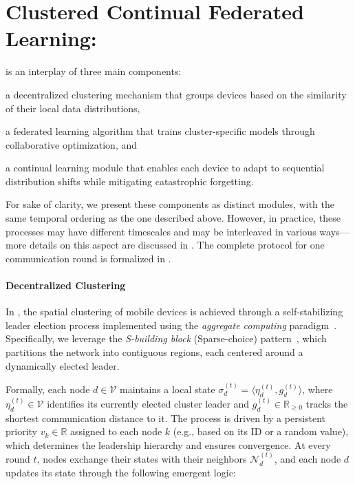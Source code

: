 \documentclass[conference]{IEEEtran}
\theoremstyle{plain}
\theoremstyle{definition}
\begin{document}
\section{Clustered Continual Federated Learning: \approach{}}\label{sec:approach}

\approach{} is an interplay of three main components:
\begin{enumerate*}[label=(\roman*)]
\item a decentralized clustering mechanism that groups devices based on the similarity of their local data distributions,
\item a federated learning algorithm that trains cluster-specific models through collaborative optimization,
and \item a continual learning module that enables each device to adapt to sequential distribution shifts while mitigating catastrophic forgetting.
\end{enumerate*}
For sake of clarity, 
 we present these components as distinct modules,
 with the same temporal ordering as the one described above.
However, 
 in practice, these processes may have different timescales and may be interleaved in various ways---more details on this aspect are discussed in .
The complete protocol for one communication round is formalized in .

\paragraph{Decentralized Clustering}
In \approach{}, the spatial clustering of mobile devices is achieved through a self-stabilizing leader election process implemented using the \emph{aggregate computing} paradigm~\cite{DBLP:journals/computer/BealPV15}. 
%
Specifically, 
 we leverage the \emph{S-building block} (Sparse-choice) pattern~\cite{DBLP:conf/saso/MoBD18}, 
 which partitions the network into contiguous regions, each centered around a dynamically elected leader. 

Formally, 
 each node $d \in \mathcal{V}$ maintains a local state $\sigma_d^{(t)} = \langle \eta_d^{(t)}, g_d^{(t)} \rangle$, 
  where $\eta_d^{(t)} \in \mathcal{V}$ identifies its currently elected cluster leader and $g_d^{(t)} \in \mathbb{R}_{\ge 0}$ tracks the shortest communication distance to it. 
 The process is driven by a persistent priority $v_k \in \mathbb{R}$ assigned to each node $k$ (e.g., based on its ID or a random value), which determines the leadership hierarchy and ensures convergence. 
 At every round $t$, nodes exchange their states with their neighbors $\mathcal{N}_d^{(t)}$, 
 and each node $d$ updates its state through the following emergent logic:
\end{document}
